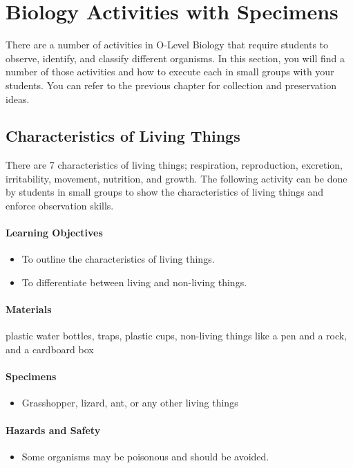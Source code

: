 \chapter{Biology Activities with Specimens}
There are a number of activities in O-Level Biology that require students to observe, identify, and classify different organisms. In this section, you will find a number of those activities and how to execute each in small groups with your students. You can refer to the previous chapter for collection and preservation ideas.

\section{Characteristics of Living Things}
There are 7 characteristics of living things; respiration, reproduction, excretion, irritability, movement, nutrition, and growth. The following activity can be done by students in small groups to show the characteristics of living things and enforce observation skills.

\subsubsection*{Learning Objectives}
\begin{itemize}
\item{To outline the characteristics of living things.}
\item{To differentiate between living and non-living things.}
\end{itemize}

\subsubsection*{Materials}
plastic water bottles, traps, plastic cups, non-living things like a pen and a rock, and a cardboard box

\subsubsection*{Specimens}
\begin{itemize}
\item{Grasshopper, lizard, ant, or any other living things}
\end{itemize}

\subsubsection*{Hazards and Safety}
\begin{itemize}
\item{Some organisms may be poisonous and should be avoided.}
\end{itemize}

